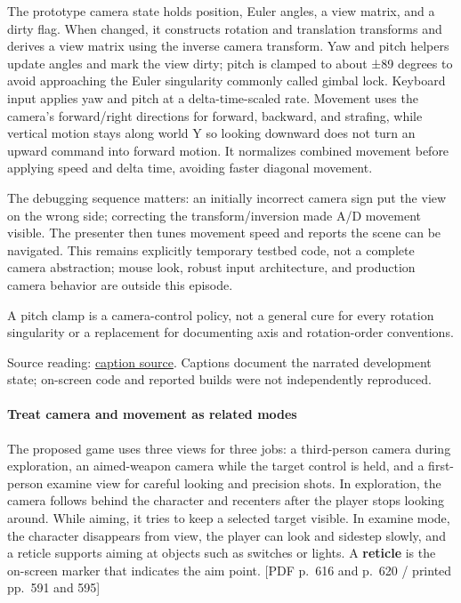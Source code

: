 The prototype camera state holds position, Euler angles, a view matrix, and a dirty flag. When changed, it constructs rotation and translation transforms and derives a view matrix using the inverse camera transform. Yaw and pitch helpers update angles and mark the view dirty; pitch is clamped to about ±89 degrees to avoid approaching the Euler singularity commonly called gimbal lock. Keyboard input applies yaw and pitch at a delta-time-scaled rate. Movement uses the camera's forward/right directions for forward, backward, and strafing, while vertical motion stays along world Y so looking downward does not turn an upward command into forward motion. It normalizes combined movement before applying speed and delta time, avoiding faster diagonal movement.

The debugging sequence matters: an initially incorrect camera sign put the view on the wrong side; correcting the transform/inversion made A/D movement visible. The presenter then tunes movement speed and reports the scene can be navigated. This remains explicitly temporary testbed code, not a complete camera abstraction; mouse look, robust input architecture, and production camera behavior are outside this episode.

A pitch clamp is a camera-control policy, not a general cure for every rotation singularity or a replacement for documenting axis and rotation-order conventions.

Source reading: \href{https://www.youtube.com/watch?v=s9xSwQvbG2w}{caption source}. Captions document the narrated development state; on-screen code and reported builds were not independently reproduced.

\paragraph{Treat camera and movement as related modes}\label{06-engine-ii-ch026-treat-camera-and-movement-as-related-modes}

\hypertarget{06-engine-ii-ch026-treat-camera-and-movement-as-related-modes}{}

The proposed game uses three views for three jobs: a third-person camera during exploration, an aimed-weapon camera while the target control is held, and a first-person examine view for careful looking and precision shots. In exploration, the camera follows behind the character and recenters after the player stops looking around. While aiming, it tries to keep a selected target visible. In examine mode, the character disappears from view, the player can look and sidestep slowly, and a reticle supports aiming at objects such as switches or lights. A \textbf{reticle} is the on-screen marker that indicates the aim point. {[}PDF p.~616 and p.~620 / printed pp.~591 and 595{]}

